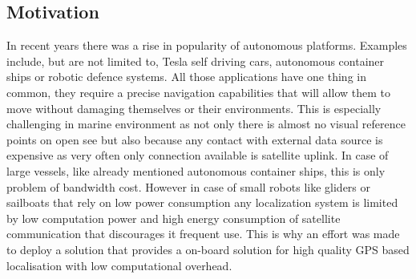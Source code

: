 \documentclass{kybernetika}
\begin{document}
\subsection{Motivation}
In recent years there was a rise in popularity of autonomous platforms. Examples include, but
are not limited to, Tesla self driving cars, autonomous container ships or robotic defence 
systems. All those applications have one thing in common, they require a precise navigation 
capabilities that will allow them to move without damaging themselves or their environments. 
This is especially challenging in marine environment as not only there is almost no visual
reference points on open see but also because any contact with external data source is expensive
as very often only connection available is satellite uplink.
In case of large vessels, like already mentioned autonomous container ships, this is only
problem of bandwidth cost. 
However in case of small robots like gliders or sailboats that rely on low power consumption 
any localization system is limited by low computation power and high energy consumption of 
satellite communication that discourages it frequent use.
This is why an effort was made to deploy a solution that provides a on-board solution for high
quality GPS based localisation with low computational overhead.
\end{document}
